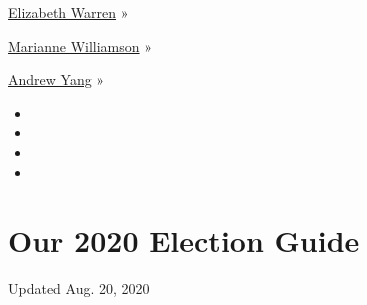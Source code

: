 \href{https://www.nytimes3xbfgragh.onion/interactive/2020/us/elections/elizabeth-warren.html}{Elizabeth
Warren} »

\href{https://www.nytimes3xbfgragh.onion/interactive/2020/us/elections/marianne-williamson.html}{Marianne
Williamson} »

\href{https://www.nytimes3xbfgragh.onion/interactive/2020/us/elections/andrew-yang.html}{Andrew
Yang} »

\begin{itemize}
\item
\item
\item
\item
\end{itemize}

\hypertarget{our-2020-election-guide}{%
\section{Our 2020 Election Guide}\label{our-2020-election-guide}}

Updated Aug. 20, 2020

